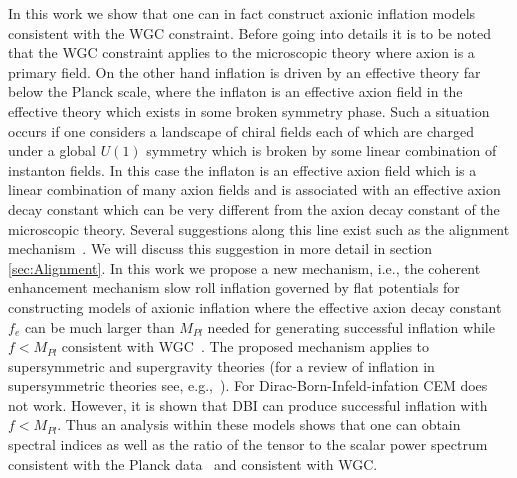 \documentclass[12pt]{article}
\begin{document}
In this work we show that one can in fact construct axionic inflation models consistent with the WGC constraint.
Before going into details it is to be noted that the WGC constraint applies to the microscopic theory where axion is a primary field.
On the other hand inflation is driven by an effective theory far below the Planck scale, where the inflaton is an effective axion field in the effective theory which exists in some broken symmetry phase.
Such a situation occurs if one considers a landscape of chiral fields each of which are charged under a global $U\left(1\right)$ symmetry which is broken by some linear combination of instanton fields.
In this case the inflaton is an effective axion field which is a linear combination of many axion fields and is associated with an effective axion decay constant which can be very different from the axion decay constant of the microscopic theory.
Several suggestions along this line exist such as the alignment mechanism~\cite{Kim:2004rp, Long:2014dta}.
We will discuss this suggestion in more detail in section \ref{sec:Alignment}.
In this work we propose a new mechanism, i.e., the coherent enhancement mechanism slow roll inflation governed by flat potentials for constructing models of axionic inflation where the effective axion decay constant $f_e$ can be much larger than $M_{Pl}$ needed for generating successful inflation while $f < M_{Pl}$ consistent with WGC~\cite{Nath:2017ihp}.
The proposed mechanism applies to supersymmetric and supergravity theories (for a review of inflation in supersymmetric theories see, e.g.,~\cite{Nath:2016qzm}).
For Dirac-Born-Infeld-infation CEM does not work.
However, it is shown that DBI can produce successful inflation with $f < M_{Pl}$.
Thus an analysis within these models shows that one can obtain spectral indices as well as the ratio of the tensor to the scalar power spectrum consistent with the Planck data~\cite{Akrami:2018vks, Akrami:2018odb, Array:2015xqh} and consistent with WGC.
\end{document}
